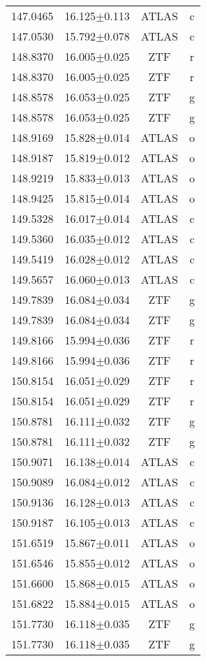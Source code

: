 \begin{table}
\begin{tabular}{cccc}
147.0465 & 16.125$\pm$0.113 & ATLAS & c \\
147.0530 & 15.792$\pm$0.078 & ATLAS & c \\
148.8370 & 16.005$\pm$0.025 & ZTF & r \\
148.8370 & 16.005$\pm$0.025 & ZTF & r \\
148.8578 & 16.053$\pm$0.025 & ZTF & g \\
148.8578 & 16.053$\pm$0.025 & ZTF & g \\
148.9169 & 15.828$\pm$0.014 & ATLAS & o \\
148.9187 & 15.819$\pm$0.012 & ATLAS & o \\
148.9219 & 15.833$\pm$0.013 & ATLAS & o \\
148.9425 & 15.815$\pm$0.014 & ATLAS & o \\
149.5328 & 16.017$\pm$0.014 & ATLAS & c \\
149.5360 & 16.035$\pm$0.012 & ATLAS & c \\
149.5419 & 16.028$\pm$0.012 & ATLAS & c \\
149.5657 & 16.060$\pm$0.013 & ATLAS & c \\
149.7839 & 16.084$\pm$0.034 & ZTF & g \\
149.7839 & 16.084$\pm$0.034 & ZTF & g \\
149.8166 & 15.994$\pm$0.036 & ZTF & r \\
149.8166 & 15.994$\pm$0.036 & ZTF & r \\
150.8154 & 16.051$\pm$0.029 & ZTF & r \\
150.8154 & 16.051$\pm$0.029 & ZTF & r \\
150.8781 & 16.111$\pm$0.032 & ZTF & g \\
150.8781 & 16.111$\pm$0.032 & ZTF & g \\
150.9071 & 16.138$\pm$0.014 & ATLAS & c \\
150.9089 & 16.084$\pm$0.012 & ATLAS & c \\
150.9136 & 16.128$\pm$0.013 & ATLAS & c \\
150.9187 & 16.105$\pm$0.013 & ATLAS & c \\
151.6519 & 15.867$\pm$0.011 & ATLAS & o \\
151.6546 & 15.855$\pm$0.012 & ATLAS & o \\
151.6600 & 15.868$\pm$0.015 & ATLAS & o \\
151.6822 & 15.884$\pm$0.015 & ATLAS & o \\
151.7730 & 16.118$\pm$0.035 & ZTF & g \\
151.7730 & 16.118$\pm$0.035 & ZTF & g \\

\end{tabular}
\end{table}
